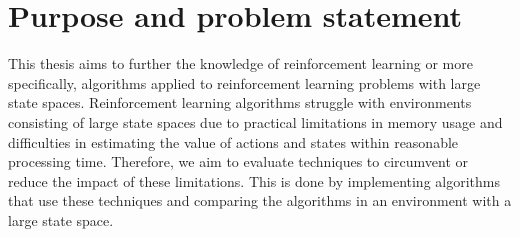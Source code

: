 \section{Purpose and problem statement}

This thesis aims to further the knowledge of reinforcement learning or more specifically, algorithms applied to reinforcement learning problems with large state spaces. Reinforcement learning algorithms struggle with environments consisting of large state spaces due to practical limitations in memory usage and difficulties in estimating the value of actions and states within reasonable processing time. Therefore, we aim to evaluate techniques to circumvent or reduce the impact of these limitations. This is done by implementing algorithms that use these techniques and comparing the algorithms in an environment with a large state space.

